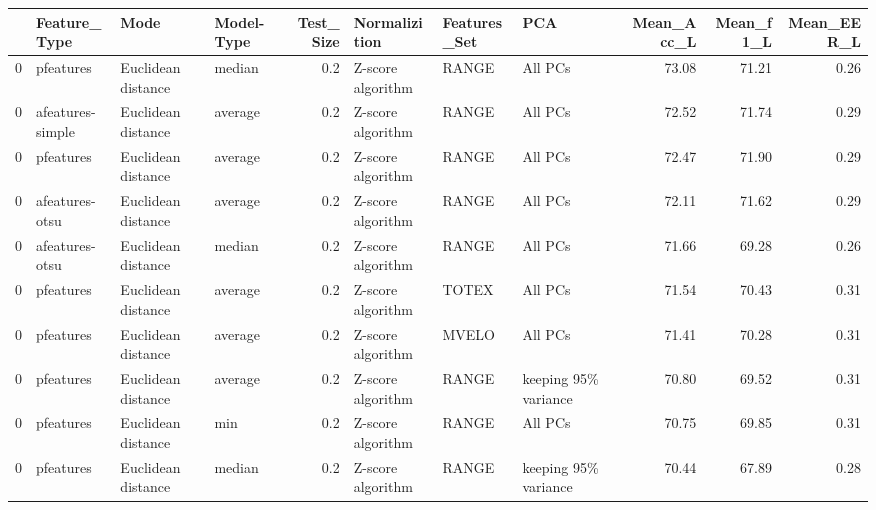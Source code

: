 \begin{tabular}{llllrlllrrr}
\toprule
{} &      Feature\_Type &                Mode & Model-Type &  Test\_Size &      Normalizition & Features\_Set &                   PCA &  Mean\_Acc\_L &  Mean\_f1\_L &  Mean\_EER\_L \\
\midrule
0 &         pfeatures &  Euclidean distance &     median &        0.2 &  Z-score algorithm &        RANGE &               All PCs &       73.08 &      71.21 &        0.26 \\
0 &  afeatures-simple &  Euclidean distance &    average &        0.2 &  Z-score algorithm &        RANGE &               All PCs &       72.52 &      71.74 &        0.29 \\
0 &         pfeatures &  Euclidean distance &    average &        0.2 &  Z-score algorithm &        RANGE &               All PCs &       72.47 &      71.90 &        0.29 \\
0 &    afeatures-otsu &  Euclidean distance &    average &        0.2 &  Z-score algorithm &        RANGE &               All PCs &       72.11 &      71.62 &        0.29 \\
0 &    afeatures-otsu &  Euclidean distance &     median &        0.2 &  Z-score algorithm &        RANGE &               All PCs &       71.66 &      69.28 &        0.26 \\
0 &         pfeatures &  Euclidean distance &    average &        0.2 &  Z-score algorithm &        TOTEX &               All PCs &       71.54 &      70.43 &        0.31 \\
0 &         pfeatures &  Euclidean distance &    average &        0.2 &  Z-score algorithm &        MVELO &               All PCs &       71.41 &      70.28 &        0.31 \\
0 &         pfeatures &  Euclidean distance &    average &        0.2 &  Z-score algorithm &        RANGE &  keeping 95\% variance &       70.80 &      69.52 &        0.31 \\
0 &         pfeatures &  Euclidean distance &        min &        0.2 &  Z-score algorithm &        RANGE &               All PCs &       70.75 &      69.85 &        0.31 \\
0 &         pfeatures &  Euclidean distance &     median &        0.2 &  Z-score algorithm &        RANGE &  keeping 95\% variance &       70.44 &      67.89 &        0.28 \\
\bottomrule
\end{tabular}
